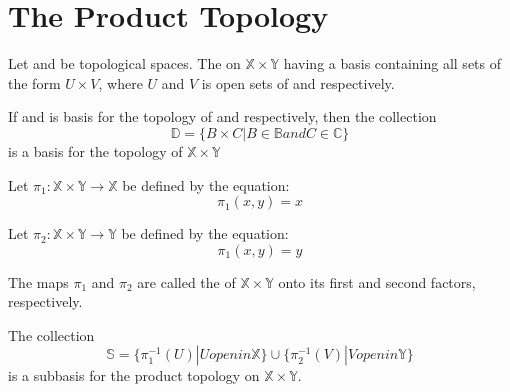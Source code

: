 \section{The Product Topology}

\begin{definition}\label{def:ProductTopology}
      Let  and  be topological spaces. The  on $ \mathbb{X} \times \mathbb{Y} $ having a basis  containing all sets of the form $ U \times V $, where $ U $ and $ V $ is open sets of  and  respectively.
\end{definition}

\begin{theorem}\omitObviuos
      If  and  is basis for the topology of  and  respectively, then the collection
      \begin{equation*}
            \mathbb{D} = \{ B \times C | B \in \mathbb{B} and C \in \mathbb{C} \}
      \end{equation*}
      is a basis for the topology of $ \mathbb{X} \times \mathbb{Y} $
\end{theorem}

\begin{definition}[projection]\label{def:Projection}
      Let $ \pi_{1}: \mathbb{X} \times \mathbb{Y} \rightarrow \mathbb{X} $ be defined by the equation:
      \begin{equation*}
            \pi_{1}(x,y) = x
      \end{equation*} 

      Let $ \pi_{2}: \mathbb{X} \times \mathbb{Y} \rightarrow \mathbb{Y} $ be defined by the equation:
      \begin{equation*}
            \pi_{1}(x,y) = y
      \end{equation*} 

      The maps $ \pi_{1} $ and $ \pi_{2} $ are called the  of $ \mathbb{X} \times \mathbb{Y} $ onto its first and second factors, respectively.
\end{definition}

\begin{theorem}\omitObviuos
      The collection
      \begin{equation*}
            \mathbb{S} = \{ \pi_{1}^{-1}(U) | U open in \mathbb{X} \} \cup \{ \pi_{2}^{-1}(V) | V open in \mathbb{Y} \}
      \end{equation*}
      is a subbasis for the product topology on $ \mathbb{X} \times \mathbb{Y} $.
\end{theorem}